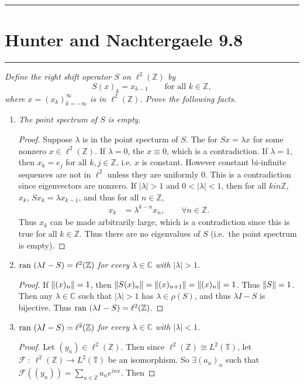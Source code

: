 \documentclass{article} %
\theoremstyle{plain}
\def\Cx{\mathbb{C}}
\newcommand{\ran}{\text{\rm ran }}
\newcommand{\problem}[1]{
\vspace{.375cm}
\begin{minipage}{\textwidth}
    \begin{center}
        \noindent\rule{5cm}{1pt}
    \end{center}
    \section{\bf #1}
    \begin{center}
        \noindent\rule{5cm}{1pt}
    \end{center}
    \vspace{0.25cm}
\end{minipage}
}
\numberwithin{equation}{section} %
\numberwithin{figure}{section} %
\numberwithin{table}{section} %
\begin{document}
\problem{Hunter and Nachtergaele 9.8}
\emph{Define the right shift operator $S$ on $\ell^2(\mathbb{Z})$ by $$S(x)_k = x_{k-1} \qquad \text{for all }k \in \mathbb{Z},$$ where $x = (x_k)_{k=-\infty}^\infty$ is in $\ell^2(\mathbb{Z})$.  Prove the following facts.}
\begin{enumerate}[\it a)]
    \item
        \emph{The point spectrum of $S$ is empty.}
        \begin{proof}
            Suppose $\lambda$ is in the point specturm of $S$.  The for $Sx = \lambda x$ for some nonzero $x \in \ell^2(\mathbb{Z})$.  If $\lambda = 0$, the $x \equiv 0$, which is a contradiction.  If $\lambda = 1$, then $x_k = e_j$ for all $k,j \in \mathbb{Z}$, i.e. $x$ is constant.  However constant bi-infinite sequences are not in $\ell^2$ unless they are uniformly $0$.  This is a contradiction since eigenvectors are nonzero.  If $|\lambda| > 1$ and $0 < |\lambda| < 1$, then for all $k in \mathbb{Z}$, $x_k$, $Sx_k = \lambda x_{k-1}$, and thus for all $n \in \mathbb{Z}$,
            \begin{align*}
                x_k &= \lambda^{k-n} x_n, \qquad \forall n \in \mathbb{Z}.
            \end{align*}
            Thus $x_k$ can be made arbitrarily large, which is a contradiction since this is true for all $k \in \mathbb{Z}$.  Thus there are no eigenvalues of $S$ (i.e.~the point spectrum is empty).
        \end{proof}
    \item
        \emph{$\ran(\lambda I - S) = \ell^2(\mathbb{Z})$ for every $\lambda \in \Cx$ with $|\lambda| > 1$.}
        \begin{proof}
            If $\norm{(x)_n} = 1$, then $\norm{S(x)_n} = \norm{(x)_{n+1}} = \norm{(x)_n} = 1$.  Thus $\norm{S} = 1$.  Then any $\lambda \in \Cx$ such that $|\lambda| > 1$ has $\lambda \in \rho(S)$, and thus $\lambda I - S$ is bijective.  Thus $\ran (\lambda I - S) = \ell^2(\mathbb{Z})$.
        \end{proof}
    \item
        \emph{$\ran(\lambda I - S) = \ell^2(\mathbb{Z})$ for every $\lambda \in \Cx$ with $|\lambda| < 1$.}
        \begin{proof}
            Let $(y_n) \in \ell^2(\mathbb{Z})$.  Then since $\ell^2(\mathbb{Z}) \cong L^2(\mathbb{T})$, let $\mathcal{F}\ :\ \ell^2(\mathbb{Z}) \rightarrow L^2(\mathbb{T})$ be an isomorphism.  So $\exists (a_n)_n$ such that $\mathcal{F}((y_n)) = \sum_{n\in\mathbb{Z}} a_n e^{inx}$.  Then

\end{proof}
\end{enumerate}
\end{document}
